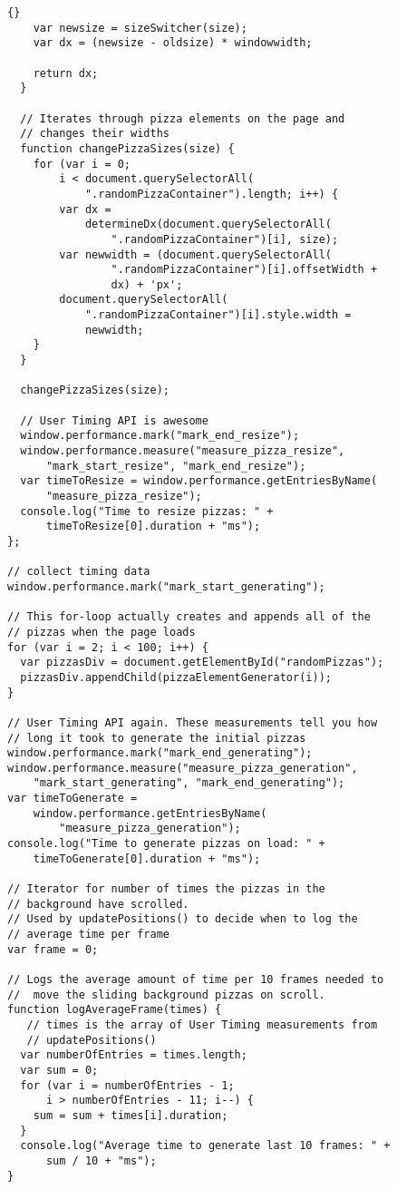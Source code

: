 \documentclass[twoside]{article}
\begin{document}
\begin{lstlisting}{}
    var newsize = sizeSwitcher(size);
    var dx = (newsize - oldsize) * windowwidth;

    return dx;
  }

  // Iterates through pizza elements on the page and 
  // changes their widths
  function changePizzaSizes(size) {
    for (var i = 0;
        i < document.querySelectorAll(
            ".randomPizzaContainer").length; i++) {
        var dx = 
            determineDx(document.querySelectorAll(
                ".randomPizzaContainer")[i], size);
        var newwidth = (document.querySelectorAll(
                ".randomPizzaContainer")[i].offsetWidth +
                dx) + 'px';
        document.querySelectorAll(
            ".randomPizzaContainer")[i].style.width =
            newwidth;
    }
  }

  changePizzaSizes(size);

  // User Timing API is awesome
  window.performance.mark("mark_end_resize");
  window.performance.measure("measure_pizza_resize",
      "mark_start_resize", "mark_end_resize");
  var timeToResize = window.performance.getEntriesByName(
      "measure_pizza_resize");
  console.log("Time to resize pizzas: " +
      timeToResize[0].duration + "ms");
};

// collect timing data
window.performance.mark("mark_start_generating");

// This for-loop actually creates and appends all of the
// pizzas when the page loads
for (var i = 2; i < 100; i++) {
  var pizzasDiv = document.getElementById("randomPizzas");
  pizzasDiv.appendChild(pizzaElementGenerator(i));
}

// User Timing API again. These measurements tell you how
// long it took to generate the initial pizzas
window.performance.mark("mark_end_generating");
window.performance.measure("measure_pizza_generation",
    "mark_start_generating", "mark_end_generating");
var timeToGenerate = 
    window.performance.getEntriesByName(
        "measure_pizza_generation");
console.log("Time to generate pizzas on load: " +
    timeToGenerate[0].duration + "ms");

// Iterator for number of times the pizzas in the
// background have scrolled.
// Used by updatePositions() to decide when to log the
// average time per frame
var frame = 0;

// Logs the average amount of time per 10 frames needed to
//  move the sliding background pizzas on scroll.
function logAverageFrame(times) {
   // times is the array of User Timing measurements from
   // updatePositions()
  var numberOfEntries = times.length;
  var sum = 0;
  for (var i = numberOfEntries - 1;
      i > numberOfEntries - 11; i--) {
    sum = sum + times[i].duration;
  }
  console.log("Average time to generate last 10 frames: " +
      sum / 10 + "ms");
}


\end{lstlisting}
\end{document}
